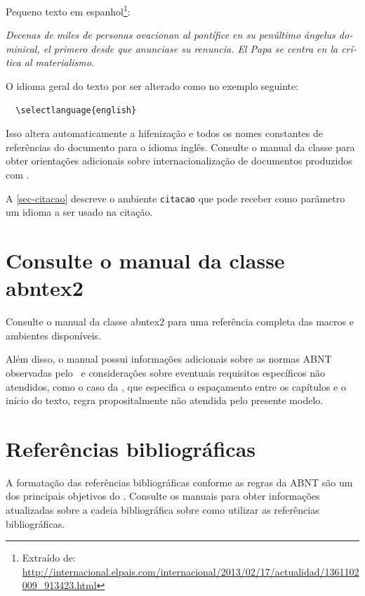 Pequeno texto em espanhol\footnote{Extraído de:
\url{http://internacional.elpais.com/internacional/2013/02/17/actualidad/1361102009_913423.html}}:

\foreignlanguage{spanish}{\textit{Decenas de miles de personas ovacionan al pontífice en su
penúltimo ángelus dominical, el primero desde que anunciase su renuncia. El Papa se
centra en la crítica al materialismo}}.

O idioma geral do texto por ser alterado como no exemplo seguinte:

\begin{verbatim}
  \selectlanguage{english}
\end{verbatim}

Isso altera automaticamente a hifenização e todos os nomes constantes de
referências do documento para o idioma inglês. Consulte o manual da classe
\cite{abntex2classe} para obter orientações adicionais sobre internacionalização de
documentos produzidos com \abnTeX.

A \autoref{sec-citacao} descreve o ambiente \texttt{citacao} que pode receber
como parâmetro um idioma a ser usado na citação.

\section{Consulte o manual da classe \textsf{abntex2}}

Consulte o manual da classe \textsf{abntex2} \cite{abntex2classe} para uma
referência completa das macros e ambientes disponíveis. 

Além disso, o manual possui informações adicionais sobre as normas ABNT
observadas pelo \abnTeX\ e considerações sobre eventuais requisitos específicos
não atendidos, como o caso da , que
especifica o espaçamento entre os capítulos e o início do texto, regra
propositalmente não atendida pelo presente modelo.

\section{Referências bibliográficas}

A formatação das referências bibliográficas conforme as regras da ABNT são um
dos principais objetivos do \abnTeX. Consulte os manuais
 para obter informações atualizadas sobre a cadeia bibliográfica
sobre como utilizar as referências bibliográficas.

